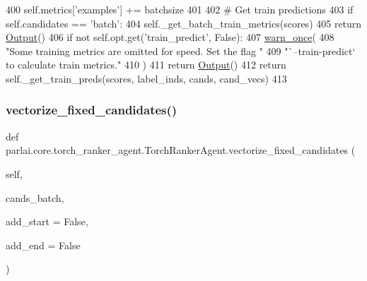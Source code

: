 \begin{DoxyCode}
400         self.metrics[\textcolor{stringliteral}{'examples'}] += batchsize
401 
402         \textcolor{comment}{# Get train predictions}
403         \textcolor{keywordflow}{if} self.candidates == \textcolor{stringliteral}{'batch'}:
404             self.\_get\_batch\_train\_metrics(scores)
405             \textcolor{keywordflow}{return} \hyperlink{namespaceparlai_1_1agents_1_1legacy__agents_1_1seq2seq_1_1torch__agent__v1_a2689006ea97d09413fb242f984bd8016}{Output}()
406         \textcolor{keywordflow}{if} \textcolor{keywordflow}{not} self.opt.get(\textcolor{stringliteral}{'train\_predict'}, \textcolor{keyword}{False}):
407             \hyperlink{namespaceparlai_1_1utils_1_1misc_acf146e70ea7f6867969a7c2b545d4b4b}{warn\_once}(
408                 \textcolor{stringliteral}{"Some training metrics are omitted for speed. Set the flag "}
409                 \textcolor{stringliteral}{"`--train-predict` to calculate train metrics."}
410             )
411             \textcolor{keywordflow}{return} \hyperlink{namespaceparlai_1_1agents_1_1legacy__agents_1_1seq2seq_1_1torch__agent__v1_a2689006ea97d09413fb242f984bd8016}{Output}()
412         \textcolor{keywordflow}{return} self.\_get\_train\_preds(scores, label\_inds, cands, cand\_vecs)
413 
\end{DoxyCode}
\mbox{\label{classparlai_1_1core_1_1torch__ranker__agent_1_1TorchRankerAgent_af2e2d618f056bb68089c7252fa07d07b}} 
\subsubsection{\texorpdfstring{vectorize\+\_\+fixed\+\_\+candidates()}{vectorize\_fixed\_candidates()}}
{\footnotesize\ttfamily def parlai.\+core.\+torch\+\_\+ranker\+\_\+agent.\+Torch\+Ranker\+Agent.\+vectorize\+\_\+fixed\+\_\+candidates (\begin{DoxyParamCaption}\item[{}]{self,  }\item[{}]{cands\+\_\+batch,  }\item[{}]{add\+\_\+start = {\ttfamily False},  }\item[{}]{add\+\_\+end = {\ttfamily False} }\end{DoxyParamCaption})}

